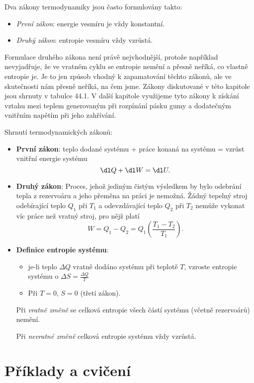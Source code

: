     Dva zákony termodynamiky jsou často formulovány takto:
    \begin{itemize}[noitemsep]
      \item \emph{První zákon}: energie vesmíru je vždy konstantní.
      \item \emph{Druhý zákon}: entropie vesmíru vždy vzrůstá.
    \end{itemize}

    Formulace druhého zákona není právě nejvhodnější, protože například nevyjadřuje, že ve vratném
    cyklu se entropie nemění a přesně neříká, co vlastně entropie je. Je to jen způsob vhodný k
    zapamatování těchto zákonů, ale ve skutečnosti nám přesně neříká, na čem jsme. Zákony
    diskutované v této kapitole jsou shrnuty v tabulce 44.1. V další kapitole využijeme tyto zákony
    k získání vztahu mezi teplem generovaným při rozpínání pásku gumy a dodatečným vnitřním napětím
    při jeho zahřívání.

    \begin{mdframed}[style=mdnote]
      \begin{note}Shrnutí termodynamických zákonů:
        \begin{itemize}[noitemsep]
          \item \textbf{První zákon}: teplo dodané systému + práce konaná na systému = vzrůst
                vnitřní energie systému 
                \begin{equation*}
                  \dl Q + \dl W=\dl U.
                \end{equation*}
          \item \textbf{Druhý zákon}: Proces, jehož jediným čistým výsledkem by bylo odebrání tepla
                z rezervoáru a jeho přeměna na práci je nemožná. Žádný tepelný stroj odebírající
                teplo \(Q_1\) při \(T_1\) a odevzdávající teplo \(Q_2\) při \(T_2\) nemůže vykonat
                víc práce než vratný stroj, pro nějž platí
                \begin{equation*}
                  W=Q_1−Q_2=Q_1\left(\frac{T_1−T_2}{T_1}\right).
                \end{equation*}
          \item \textbf{Definice entropie systému}:
                \begin{itemize}
                  \item je-li teplo \( ΔQ\) vratně dodáno systému při teplotě \(T\), vzroste
                        entropie systému o \(ΔS=\frac{ΔQ}{T}\)
                  \item Při \(T=0\), \(S=0\) (třetí zákon).
                \end{itemize}  
                Při \emph{vratně změně} se celková entropie všech částí systému (včetně rezervoárů)
                nemění.
                
                Při \emph{nevratné změně} celková entropie systému vždy vzrůstá.  
        \end{itemize}
      \end{note}
    \end{mdframed}
  
  \section{Příklady a cvičení}\label{fyz:IchapXLIVsecVII}
